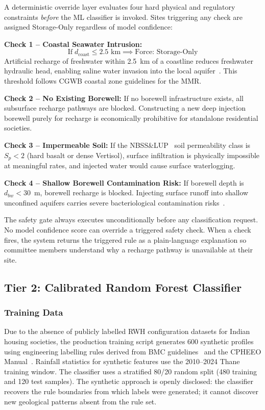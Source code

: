 ﻿\documentclass[conference]{IEEEtran}
\begin{document}
A deterministic override layer evaluates four hard physical and regulatory constraints \textit{before} the ML classifier is invoked. Sites triggering any check are assigned Storage-Only regardless of model confidence:

\textbf{Check 1 -- Coastal Seawater Intrusion:}
\begin{equation}
  \text{If}\;d_{\text{coast}} \le 2.5\text{ km}
  \implies \text{Force: Storage-Only}
  \label{eq:coastal}
\end{equation}
Artificial recharge of freshwater within 2.5~km of a coastline reduces freshwater hydraulic head, enabling saline water invasion into the local aquifer~\cite{cgwb2022}. This threshold follows CGWB coastal zone guidelines for the MMR.

\textbf{Check 2 -- No Existing Borewell:} If no borewell infrastructure exists, all subsurface recharge pathways are blocked. Constructing a new deep injection borewell purely for recharge is economically prohibitive for standalone residential societies.

\textbf{Check 3 -- Impermeable Soil:} If the NBSS\&LUP~\cite{nbsslup} soil permeability class is $S_p < 2$ (hard basalt or dense Vertisol), surface infiltration is physically impossible at meaningful rates, and injected water would cause surface waterlogging.

\textbf{Check 4 -- Shallow Borewell Contamination Risk:} If borewell depth is $d_{bw} < 30$~m, borewell recharge is blocked. Injecting surface runoff into shallow unconfined aquifers carries severe bacteriological contamination risks~\cite{cpheeo2024}.

The safety gate always executes unconditionally before any classification request. No model confidence score can override a triggered safety check. When a check fires, the system returns the triggered rule as a plain-language explanation so committee members understand why a recharge pathway is unavailable at their site.

\subsection{Tier 2: Calibrated Random Forest Classifier}

\subsubsection{Training Data}
Due to the absence of publicly labelled RWH configuration datasets for Indian housing societies, the production training script generates 600 synthetic profiles using engineering labelling rules derived from BMC guidelines~\cite{mumbai2024} and the CPHEEO Manual~\cite{cpheeo2024}. Rainfall statistics for synthetic features use the 2010--2024 Thane training window. The classifier uses a stratified 80/20 random split (480 training and 120 test samples). The synthetic approach is openly disclosed: the classifier recovers the rule boundaries from which labels were generated; it cannot discover new geological patterns absent from the rule set.
\end{document}
